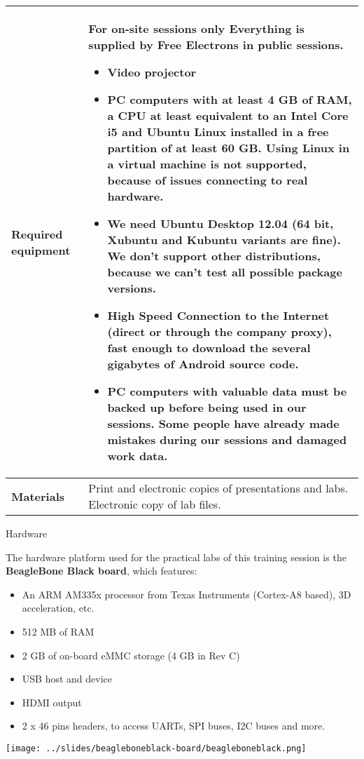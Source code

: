 \documentclass[a4paper,12pt,obeyspaces,spaces,hyphens]{article}
\begin{document}
{  \begin{tabularx}{\textwidth}{|g|h|}
    {\bf Required equipment} &
    {\bf For on-site sessions only}
    \newline Everything is supplied by Free Electrons in public sessions.
    \begin{itemize}
    \item Video projector
    \item PC computers with at least 4 GB of RAM, a CPU at least
      equivalent to an Intel Core i5 and Ubuntu Linux installed in a
      {\bf free partition of at least 60 GB. Using Linux in a virtual
        machine is not supported}, because of issues connecting to
      real hardware.
    \item We need Ubuntu Desktop 12.04 (64 bit, Xubuntu and Kubuntu
      variants are fine). We don't support other distributions,
      because we can't test all possible package versions.
    \item {\bf High Speed Connection to the Internet} (direct or
      through the company proxy), fast enough to download the several
      gigabytes of Android source code.
    \item {\bf PC computers with valuable data must be backed up}
      before being used in our sessions. Some people have already made
      mistakes during our sessions and damaged work data.
    \end{itemize} \\
    \hline

    {\bf Materials} & Print and electronic copies of presentations and
    labs.
    \newline Electronic copy of lab files.\\
    \hline

\end{tabularx}}
\normalsize

\feagendatwocolumn
{Hardware}
{
  The hardware platform used for the practical labs of this training
  session is the {\bf BeagleBone Black board}, which features:

  \begin{itemize}
  \item An ARM AM335x processor from Texas Instruments (Cortex-A8
    based), 3D acceleration, etc.
  \item 512 MB of RAM
  \item 2 GB of on-board eMMC storage
        \newline(4 GB in Rev C)
  \item USB host and device
  \item HDMI output
  \item 2 x 46 pins headers, to access UARTs, SPI buses, I2C buses
    and more.
  \end{itemize}
}
{}
{
  \begin{center}
    \texttt{[image: ../slides/beagleboneblack-board/beagleboneblack.png]}
  \end{center}
}
\end{document}
